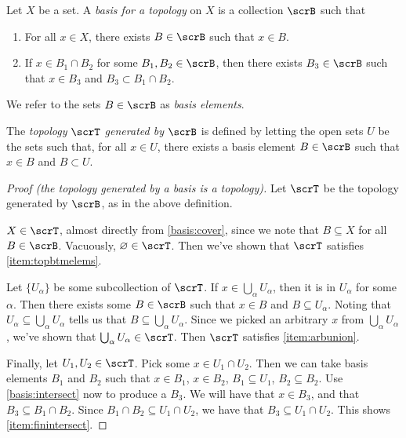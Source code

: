 \documentclass{article}
\begin{document}
\begin{definition}
    Let $X$ be a set.
A \textit{basis for a topology} on $X$ is a collection $\scrB$ such that
    \begin{enumerate}[label=(B\arabic*)]
        \item For all $x \in X$, there exists $B \in \scrB$ such that $x \in B$. 
            \label{basis:cover}
        \item If $x \in B_1 \cap B_2$ for some $B_1, B_2 \in \scrB$, then there exists $B_3 \in \scrB$ such that $x \in B_3$ and $B_3 \subset B_1 \cap B_2$. 
            \label{basis:intersect}
    \end{enumerate}
    We refer to the sets $B \in \scrB$ as \textit{basis elements}.

    The \textit{topology $\scrT$ generated by $\scrB$} is defined by letting the open sets $U$ be the sets such that, for all $x \in U$, there exists a basis element $B \in \scrB$ such that $x \in B$ and $B \subset U$.
\end{definition}

\begin{proof}[Proof (the topology generated by a basis is a topology)]
    Let $\scrT$ be the topology generated by $\scrB$, as in the above definition.

    $X \in \scrT$, almost directly from \ref{basis:cover}, since we note that $B \subseteq X$ for all $B \in \scrB$.
    Vacuously, $\varnothing \in \scrT$.
    Then we've shown that $\scrT$ satisfies \ref{item:topbtmelems}.

    Let $\{U_\alpha\}$ be some subcollection of $\scrT$.
    If $x \in \bigcup_\alpha U_\alpha$, then it is in $U_\alpha$ for some $\alpha$.
    Then there exists some $B \in \scrB$ such that $x \in B$ and $B \subseteq U_\alpha$.
    Noting that $U_\alpha \subseteq \bigcup_\alpha U_\alpha$ tells us that $B \subseteq \bigcup_\alpha U_\alpha$.
    Since we picked an arbitrary $x$ from $\bigcup_\alpha U_\alpha$, we've shown that $\bigcup_\alpha U_\alpha \in \scrT$.
    Then $\scrT$ satisfies \ref{item:arbunion}.

    Finally, let $U_1, U_2 \in \scrT$.
    Pick some $x \in U_1 \cap U_2$.
    Then we can take basis elements $B_1$ and $B_2$ such that $x \in B_1$, $x \in B_2$, $B_1 \subseteq U_1$, $B_2 \subseteq B_2$.
    Use \ref{basis:intersect} now to produce a $B_3$.
    We will have that $x \in B_3$, and that $B_3 \subseteq B_1 \cap B_2$.
    Since $B_1 \cap B_2 \subseteq U_1 \cap U_2$, we have that $B_3 \subseteq U_1 \cap U_2$.
    This shows \ref{item:finintersect}.
\end{proof}
\end{document}
